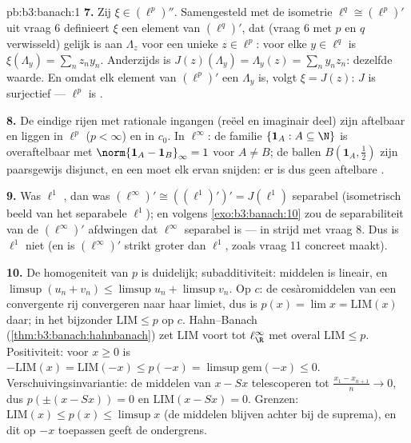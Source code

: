 \begin{solution}{pb:b3:banach:1}
\textbf{7.} Zij $\xi \in (\ell^p)''$. Samengesteld met de
isometrie $\ell^q \cong (\ell^p)'$ uit vraag 6 definieert $\xi$
een element van $(\ell^q)'$, dat (vraag 6 met $p$ en $q$
verwisseld) gelijk is aan $\Lambda_z$ voor een unieke $z \in
\ell^p$: voor elke $y \in \ell^q$ is $\xi(\Lambda_y) =
\sum_nz_ny_n$. Anderzijds is $J(z)(\Lambda_y) = \Lambda_y(z) =
\sum_ny_nz_n$: dezelfde waarde. En omdat elk element van
$(\ell^p)'$ een $\Lambda_y$ is, volgt $\xi = J(z)$: $J$ is
surjectief --- $\ell^p$ is .

\textbf{8.} De eindige rijen met rationale ingangen (reëel en
imaginair deel) zijn aftelbaar en liggen  in $\ell^p$ ($p <
\infty$) en in $c_0$. In $\ell^\infty$: de familie $\{\mathbf 1_A
: A \subseteq \N\}$ is overaftelbaar met $\norm{\mathbf 1_A -
\mathbf 1_B}_\infty = 1$ voor $A \neq B$; de ballen $B(\mathbf
1_A, \frac12)$ zijn paarsgewijs disjunct, en een  moet elk ervan snijden: er is dus geen aftelbare
.

\textbf{9.} Was $\ell^1$ , dan was $(\ell^\infty)' \cong
((\ell^1)')' = J(\ell^1)$ separabel (isometrisch beeld van het
separabele $\ell^1$); en volgens \cref{exo:b3:banach:10} zou de
separabiliteit van de  $(\ell^\infty)'$ afdwingen dat
$\ell^\infty$ separabel is --- in strijd met vraag 8. Dus is
$\ell^1$ niet  (en is $(\ell^\infty)'$ strikt groter dan
$\ell^1$, zoals vraag 11 concreet maakt).

\textbf{10.} De homogeniteit van $p$ is duidelijk;
subadditiviteit: middelen is lineair, en $\limsup(u_n + v_n) \leq
\limsup u_n + \limsup v_n$. Op $c$: de cesàromiddelen van een
convergente rij convergeren naar haar limiet, dus is $p(x) = \lim
x = \mathrm{LIM}(x)$ daar; in het bijzonder $\mathrm{LIM} \leq p$
op $c$. Hahn--Banach (\cref{thm:b3:banach:hahnbanach}) zet
$\mathrm{LIM}$ voort tot $\ell^\infty_\R$ met overal
$\mathrm{LIM} \leq p$. Positiviteit: voor $x \geq 0$ is
$-\mathrm{LIM}(x) = \mathrm{LIM}(-x) \leq p(-x) =
\limsup\text{gem}(-x) \leq 0$. Verschuivingsinvariantie: de
middelen van $x - Sx$ telescoperen tot $\frac{x_1 - x_{n+1}}n \to
0$, dus $p(\pm(x - Sx)) = 0$ en $\mathrm{LIM}(x - Sx) = 0$.
Grenzen: $\mathrm{LIM}(x) \leq p(x) \leq \limsup x$ (de middelen
blijven achter bij de suprema), en dit op $-x$ toepassen geeft de
ondergrens.


\end{solution}
